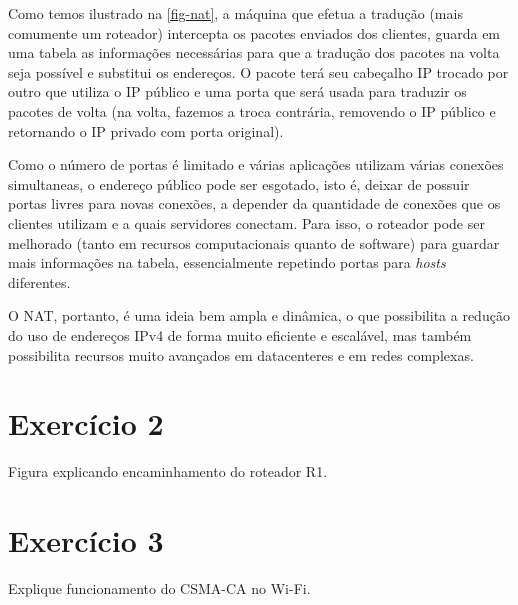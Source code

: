 \documentclass[brazilian,a4paper]{article}
\begin{document}
Como temos ilustrado na \cref{fig-nat}, a máquina que efetua a tradução (mais comumente um roteador) intercepta os pacotes enviados dos clientes, guarda em uma tabela as informações necessárias para que a tradução dos pacotes na volta seja possível e substitui os endereços. O pacote terá seu cabeçalho IP trocado por outro que utiliza o IP público e uma porta que será usada para traduzir os pacotes de volta (na volta, fazemos a troca contrária, removendo o IP público e retornando o IP privado com porta original).

Como o número de portas é limitado e várias aplicações utilizam várias conexões simultaneas, o endereço público pode ser esgotado, isto é, deixar de possuir portas livres para novas conexões, a depender da quantidade de conexões que os clientes utilizam e a quais servidores conectam. Para isso, o roteador pode ser melhorado (tanto em recursos computacionais quanto de software) para guardar mais informações na tabela, essencialmente repetindo portas para \textit{hosts} diferentes.

O NAT, portanto, é uma ideia bem ampla e dinâmica, o que possibilita a redução do uso de endereços IPv4 de forma muito eficiente e escalável, mas também possibilita recursos muito avançados em datacenteres e em redes complexas.


\section*{Exercício 2}

Figura explicando encaminhamento do roteador R1.


\section*{Exercício 3}

Explique funcionamento do CSMA-CA no Wi-Fi.
\end{document}
